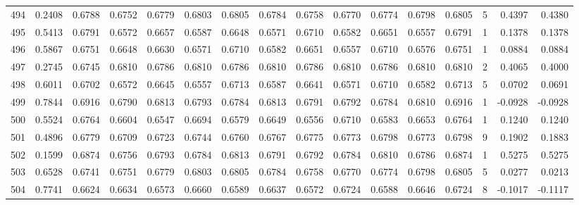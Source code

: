 \begin{tabular}{lrrrrrrrrrrrrrrr}
494 &      0.2408 &  0.6788 &  0.6752 &  0.6779 &  0.6803 &  0.6805 &  0.6784 &  0.6758 &  0.6770 &  0.6774 &   0.6798 &     0.6805 &      5 &                    0.4397 &                     0.4380 \\
495 &      0.5413 &  0.6791 &  0.6572 &  0.6657 &  0.6587 &  0.6648 &  0.6571 &  0.6710 &  0.6582 &  0.6651 &   0.6557 &     0.6791 &      1 &                    0.1378 &                     0.1378 \\
496 &      0.5867 &  0.6751 &  0.6648 &  0.6630 &  0.6571 &  0.6710 &  0.6582 &  0.6651 &  0.6557 &  0.6710 &   0.6576 &     0.6751 &      1 &                    0.0884 &                     0.0884 \\
497 &      0.2745 &  0.6745 &  0.6810 &  0.6786 &  0.6810 &  0.6786 &  0.6810 &  0.6786 &  0.6810 &  0.6786 &   0.6810 &     0.6810 &      2 &                    0.4065 &                     0.4000 \\
498 &      0.6011 &  0.6702 &  0.6572 &  0.6645 &  0.6557 &  0.6713 &  0.6587 &  0.6641 &  0.6571 &  0.6710 &   0.6582 &     0.6713 &      5 &                    0.0702 &                     0.0691 \\
499 &      0.7844 &  0.6916 &  0.6790 &  0.6813 &  0.6793 &  0.6784 &  0.6813 &  0.6791 &  0.6792 &  0.6784 &   0.6810 &     0.6916 &      1 &                   -0.0928 &                    -0.0928 \\
500 &      0.5524 &  0.6764 &  0.6604 &  0.6547 &  0.6694 &  0.6579 &  0.6649 &  0.6556 &  0.6710 &  0.6583 &   0.6653 &     0.6764 &      1 &                    0.1240 &                     0.1240 \\
501 &      0.4896 &  0.6779 &  0.6709 &  0.6723 &  0.6744 &  0.6760 &  0.6767 &  0.6775 &  0.6773 &  0.6798 &   0.6773 &     0.6798 &      9 &                    0.1902 &                     0.1883 \\
502 &      0.1599 &  0.6874 &  0.6756 &  0.6793 &  0.6784 &  0.6813 &  0.6791 &  0.6792 &  0.6784 &  0.6810 &   0.6786 &     0.6874 &      1 &                    0.5275 &                     0.5275 \\
503 &      0.6528 &  0.6741 &  0.6751 &  0.6779 &  0.6803 &  0.6805 &  0.6784 &  0.6758 &  0.6770 &  0.6774 &   0.6798 &     0.6805 &      5 &                    0.0277 &                     0.0213 \\
504 &      0.7741 &  0.6624 &  0.6634 &  0.6573 &  0.6660 &  0.6589 &  0.6637 &  0.6572 &  0.6724 &  0.6588 &   0.6646 &     0.6724 &      8 &                   -0.1017 &                    -0.1117 \\

\end{tabular}
